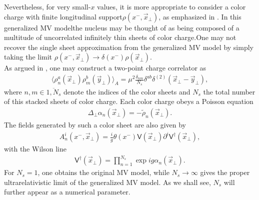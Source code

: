Nevertheless, for very small-$x$ values, it is more appropriate to consider a color charge with finite longitudinal support$\rho(x^-,\vec{x}_\perp)$, as emphasized in \cite{jalilian}. In this generalized {\sffamily MV} modelthe nucleus may be thought of as being composed of a multitude of uncorrelated infinitely thin sheets of color charge.One may not recover the single sheet approximation from the generalized {\sffamily MV} model by simply taking the limit $\rho(x^-,\vec{x}_\perp)\rightarrow\delta(x^-)\rho(\vec{x}_\perp)$. \\
As argued in \cite{fukushima}, one may construct a two-point charge correlator as
\begin{align}\label{sglasma28}
    \langle\rho^a_n(\vec{x}_\perp)\rho^b_m(\vec{y}_\perp)\rangle_A=\mu^2\frac{\delta_{nm}}{N_s}\delta^{ab}\delta^{(2)}(\vec{x}_\perp-\vec{y}_\perp),
\end{align}
where $n,m\in\overline{1,N_s}$ denote the indices of the color sheets and $N_s$ the total number of this stacked sheets of color charge. Each color charge obeys a Poisson equation
\begin{align}\label{sglasma}
    \Delta_\perp\alpha_n(\vec{x}_\perp)=-\widetilde{\rho}_n(\vec{x}_\perp).
\end{align}
The fields generated by such a color sheet are also given by
\begin{align*}
   A^i_n(x^-,\vec{x}_\perp)=\frac{i}{g}\theta(x^-)\textsf{V}(\vec{x}_\perp)\partial^i\textsf{V}^\dagger(\vec{x}_\perp),
\end{align*}
with the Wilson line
\begin{align}\label{sglasma30}
    \textsf{V}^\dagger(\vec{x}_\perp)=\prod\limits_{n=1}^{N_s}\exp{ig\alpha_n(\vec{x}_\perp)}.
\end{align}
For $N_s=1$, one obtains the original {\sffamily MV} model, while $N_s\rightarrow\infty$ gives the proper ultrarelativistic limit of the generalized {\sffamily MV} model. As we shall see, $N_s$ will further appear as a numerical parameter.

